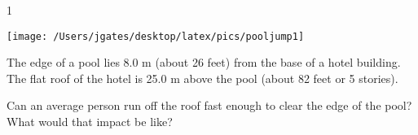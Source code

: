 
\AddToShipoutPicture*{\BackgroundPic}

\addtocounter {ProbNum} {1}

\begin{floatingfigure}[r]{.35\textwidth}
\texttt{[image: /Users/jgates/desktop/latex/pics/pooljump1]}
\end{floatingfigure}
 
{\bf \Large{}} The edge of a pool lies 8.0 m (about 26 feet) from the base of a hotel building. The flat roof of the hotel is 25.0 m above the pool (about 82 feet or 5 stories). 

\bigskip
Can an average person run off the roof fast enough to clear the edge of the pool? What would that impact be like?




\vfill
\newpage
